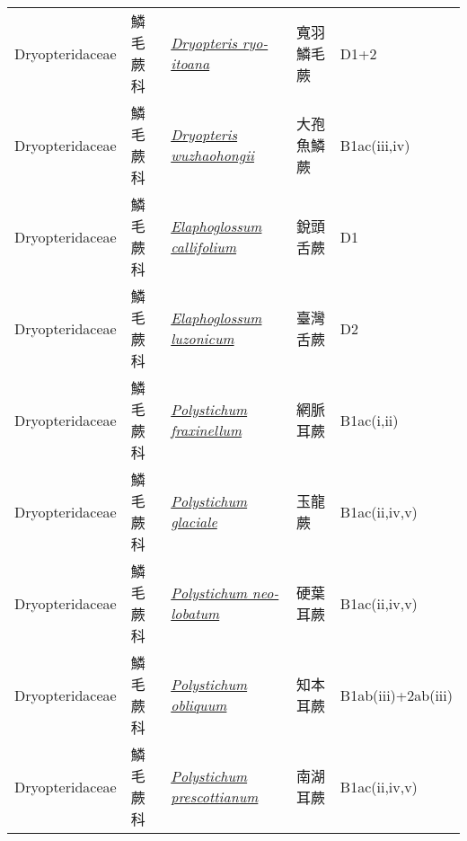 {\begin{longtable}{p{2.5cm}p{2.5cm}p{4.5cm}p{2.5cm}p{3cm}}
    Dryopteridaceae & 鱗毛蕨科 & \href{http://www.theplantlist.org/tpl1.1/search?q=Dryopteris+ryo-itoana}{\textit{Dryopteris ryo-itoana} } & 寬羽鱗毛蕨 & D1+2 \index{Dryopteris@\textit{Dryopteris}!ryo-itoana@\textit{ryo-itoana}}  \index{寬羽鱗毛蕨} \\
    Dryopteridaceae & 鱗毛蕨科 & \href{http://www.theplantlist.org/tpl1.1/search?q=Dryopteris+wuzhaohongii}{\textit{Dryopteris wuzhaohongii} } & 大孢魚鱗蕨 & B1ac(iii,iv) \index{Dryopteris@\textit{Dryopteris}!wuzhaohongii@\textit{wuzhaohongii}}  \index{大孢魚鱗蕨} \\
    Dryopteridaceae & 鱗毛蕨科 & \href{http://www.theplantlist.org/tpl1.1/search?q=Elaphoglossum+callifolium}{\textit{Elaphoglossum callifolium} } & 銳頭舌蕨 & D1 \index{Elaphoglossum@\textit{Elaphoglossum}!callifolium@\textit{callifolium}}  \index{銳頭舌蕨} \\
    Dryopteridaceae & 鱗毛蕨科 & \href{http://www.theplantlist.org/tpl1.1/search?q=Elaphoglossum+luzonicum}{\textit{Elaphoglossum luzonicum} } & 臺灣舌蕨 & D2 \index{Elaphoglossum@\textit{Elaphoglossum}!luzonicum@\textit{luzonicum}}  \index{臺灣舌蕨} \\
    Dryopteridaceae & 鱗毛蕨科 & \href{http://www.theplantlist.org/tpl1.1/search?q=Polystichum+fraxinellum}{\textit{Polystichum fraxinellum} } & 網脈耳蕨 & B1ac(i,ii) \index{Polystichum@\textit{Polystichum}!fraxinellum@\textit{fraxinellum}}  \index{網脈耳蕨} \\
    Dryopteridaceae & 鱗毛蕨科 & \href{http://www.theplantlist.org/tpl1.1/search?q=Polystichum+glaciale}{\textit{Polystichum glaciale} } & 玉龍蕨 & B1ac(ii,iv,v) \index{Polystichum@\textit{Polystichum}!glaciale@\textit{glaciale}}  \index{玉龍蕨} \\
    Dryopteridaceae & 鱗毛蕨科 & \href{http://www.theplantlist.org/tpl1.1/search?q=Polystichum+neo-lobatum}{\textit{Polystichum neo-lobatum} } & 硬葉耳蕨 & B1ac(ii,iv,v) \index{Polystichum@\textit{Polystichum}!neo-lobatum@\textit{neo-lobatum}}  \index{硬葉耳蕨} \\
    Dryopteridaceae & 鱗毛蕨科 & \href{http://www.theplantlist.org/tpl1.1/search?q=Polystichum+obliquum}{\textit{Polystichum obliquum} } & 知本耳蕨 & B1ab(iii)+2ab(iii) \index{Polystichum@\textit{Polystichum}!obliquum@\textit{obliquum}}  \index{知本耳蕨} \\
    Dryopteridaceae & 鱗毛蕨科 & \href{http://www.theplantlist.org/tpl1.1/search?q=Polystichum+prescottianum}{\textit{Polystichum prescottianum} } & 南湖耳蕨 & B1ac(ii,iv,v) \index{Polystichum@\textit{Polystichum}!prescottianum@\textit{prescottianum}}  \index{南湖耳蕨} \\

\end{longtable}}
